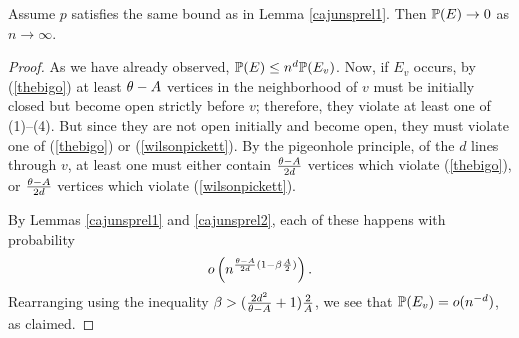 \begin{lemma} \label{cajuns}
Assume $p$ satisfies the same bound as in Lemma \ref{cajunsprel1}.
Then $\mathbb{P}(E) \to 0$ as $n \to \infty$.
\end{lemma}
\begin{proof}
As we have already observed, $\mathbb{P}(E) \le n^d\mathbb{P}(E_v)$. Now, if $E_v$ occurs, by (\ref{thebigo}) at least $\theta-A$ vertices in the neighborhood of $v$ must be initially closed but become open strictly before $v$; therefore, they violate at least one of (1)--(4). But since they are not 
open initially and become open, they must violate one of (\ref{thebigo}) or (\ref{wilsonpickett}). By the pigeonhole principle, of the $d$ lines through $v$, at least one must either contain $\frac{\theta-A}{2d}$ vertices which violate (\ref{thebigo}), or $\frac{\theta-A}{2d}$ vertices which violate (\ref{wilsonpickett}).

By Lemmas \ref{cajunsprel1}  and \ref{cajunsprel2}, each of these happens with probability 
$$ o\left(  n^{\frac{\theta-A}{2d}(1-\beta\frac{A}{2})}\right).$$
Rearranging using the inequality $\beta > (\frac{2d^2}{\theta-A}+1)\frac{2}{A}$, we see that 
$\mathbb{P}(E_v)=o(n^{-d})$, as claimed.
\end{proof}
 
